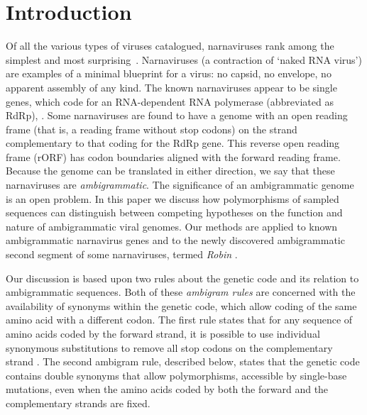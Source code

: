 \documentclass[unnumsec,webpdf,contemporary,large,namedate]{oup-authoring-template}%
\theoremstyle{thmstyleone}%
\theoremstyle{thmstyletwo}%
\theoremstyle{thmstylethree}%
\begin{document}
\maketitle


\section{Introduction}
\label{sec: 1}
Of all the various types of viruses catalogued, narnaviruses rank among the simplest
and most surprising~\citep{Cob+16}.  Narnaviruses (a contraction of \lq naked RNA virus')
are examples of a minimal blueprint for a virus: no capsid, no envelope, no apparent
assembly of any kind. The known narnaviruses appear to be single genes, which code for an
RNA-dependent RNA polymerase
(abbreviated as RdRp), \cite{Hillman2013}. Some narnaviruses
are found to have a genome with an open reading frame (that is, a reading frame without
stop codons) on the strand complementary to that coding for the RdRp gene.
This reverse open reading frame (rORF) has codon boundaries aligned with the forward reading
frame. Because the genome can be translated in either direction, we say that these narnaviruses
are \emph{ambigrammatic}. The significance of an ambigrammatic genome is an open problem.
In this paper we discuss how polymorphisms of sampled sequences can distinguish
between competing hypotheses on the function and nature of ambigrammatic viral genomes.
Our methods are applied to known ambigrammatic narnavirus genes and to the newly
discovered ambigrammatic second segment of some narnaviruses, termed \emph{Robin} \cite{Bat+20}.

Our discussion is based upon two rules about the genetic code and its relation to ambigrammatic
sequences. Both of these \emph{ambigram rules} are concerned with the availability of synonyms within
the genetic code, which allow coding of the same amino acid with a different codon.
The first rule states that for any sequence of amino acids coded by the forward strand,
it is possible to use individual synonymous substitutions to remove
all stop codons on the complementary strand \citep[this result was discussed already in][]{DeR+19}.
The second ambigram rule, described below, states that the genetic code contains double
synonyms that allow polymorphisms, accessible by single-base mutations, even when the
amino acids coded by both the forward and the complementary strands are fixed.
\end{document}
